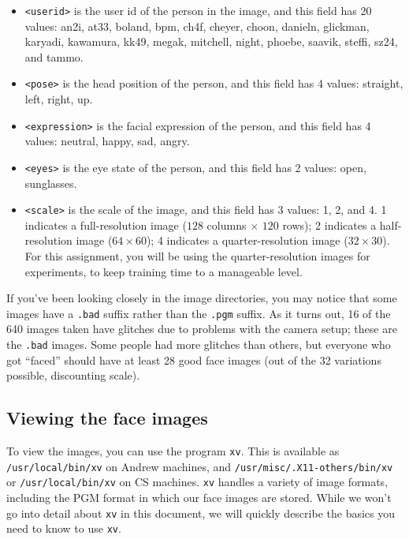 \begin{itemize}

\item {\tt <userid>} is the user id of the person in the image, and this
field has 20 values: an2i, at33, boland, bpm, ch4f, cheyer, choon, danieln,
glickman, karyadi, kawamura, kk49, megak, mitchell, night, phoebe, saavik,
steffi, sz24, and tammo.

\item {\tt <pose>} is the head position of the person, and this field
has 4 values: straight, left, right, up.

\item {\tt <expression>} is the facial expression of the person, and this
field has 4 values: neutral, happy, sad, angry.

\item {\tt <eyes>} is the eye state of the person, and this field has
2 values: open, sunglasses.

\item {\tt <scale>} is the scale of the image, and this field has 3
values: 1, 2, and 4.  1 indicates a full-resolution image ($128$ columns
$\times$ $120$ rows); 2 indicates a half-resolution image ($64 \times 60$);
4 indicates a quarter-resolution image ($32 \times 30$).  For this
assignment, you will be using the quarter-resolution images for experiments,
to keep training time to a manageable level.

\end{itemize}

If you've been looking closely in the image directories, you may notice
that some images have a {\tt .bad} suffix rather than the {\tt .pgm}
suffix.  As it turns out, 16 of the 640 images taken have glitches due to
problems with the camera setup; these are the {\tt .bad} images.
Some people had more glitches than others, but everyone who got ``faced''
should have at least 28 good face images (out of the 32 variations
possible, discounting scale).

\subsection{Viewing the face images}

To view the images, you can use the program {\tt xv}.  This is available
as {\tt /usr/local/bin/xv} on Andrew machines, and
{\tt /usr/misc/.X11-others/bin/xv} or {\tt /usr/local/bin/xv}
on CS machines.  {\tt xv} handles
a variety of image formats, including the PGM format in which our
face images are stored.  While we won't go into detail about {\tt xv}
in this document, we will quickly describe the basics you need to know
to use {\tt xv}.


